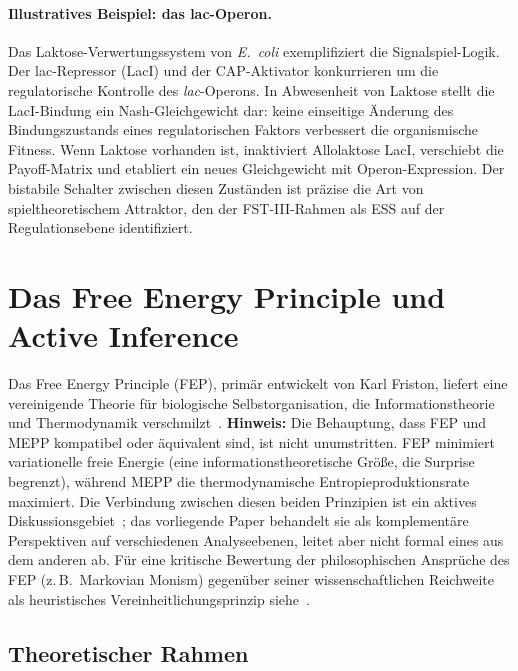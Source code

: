 \documentclass[12pt,a4paper]{article}
\theoremstyle{remark}
\begin{document}
\paragraph{Illustratives Beispiel: das lac-Operon.}
Das Laktose-Verwertungssystem von \textit{E.\ coli} exemplifiziert die Signalspiel-Logik. Der lac-Repressor (LacI) und der CAP-Aktivator konkurrieren um die regulatorische Kontrolle des \textit{lac}-Operons. In Abwesenheit von Laktose stellt die LacI-Bindung ein Nash-Gleichgewicht dar: keine einseitige Änderung des Bindungszustands eines regulatorischen Faktors verbessert die organismische Fitness. Wenn Laktose vorhanden ist, inaktiviert Allolaktose LacI, verschiebt die Payoff-Matrix und etabliert ein neues Gleichgewicht mit Operon-Expression. Der bistabile Schalter zwischen diesen Zuständen ist präzise die Art von spieltheoretischem Attraktor, den der FST-III-Rahmen als ESS auf der Regulationsebene identifiziert.

\section{Das Free Energy Principle und Active Inference}
\label{sec:fep}

Das Free Energy Principle (FEP), primär entwickelt von Karl Friston, liefert eine vereinigende Theorie für biologische Selbstorganisation, die Informationstheorie und Thermodynamik verschmilzt~\citep{FristonFreeEnergy,FristonPDF}. \textbf{Hinweis:} Die Behauptung, dass FEP und MEPP kompatibel oder äquivalent sind, ist nicht unumstritten. FEP minimiert variationelle freie Energie (eine informationstheoretische Größe, die Surprise begrenzt), während MEPP die thermodynamische Entropieproduktionsrate maximiert. Die Verbindung zwischen diesen beiden Prinzipien ist ein aktives Diskussionsgebiet~\citep{FristonFreeEnergy}; das vorliegende Paper behandelt sie als komplementäre Perspektiven auf verschiedenen Analyseebenen, leitet aber nicht formal eines aus dem anderen ab. Für eine kritische Bewertung der philosophischen Ansprüche des FEP (z.\,B.\ Markovian Monism) gegenüber seiner wissenschaftlichen Reichweite als heuristisches Vereinheitlichungsprinzip siehe~\cite{SanchezCanizares2021}.

\subsection{Theoretischer Rahmen}
\end{document}
